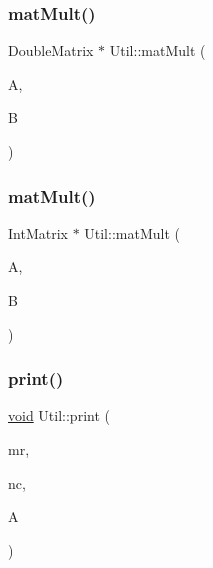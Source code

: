 \subsubsection{\texorpdfstring{mat\+Mult()}{matMult()}\hspace{0.1cm}{\footnotesize\ttfamily [5/6]}}
{\footnotesize\ttfamily Double\+Matrix $\ast$ Util\+::mat\+Mult (\begin{DoxyParamCaption}\item[{Int\+Matrix \&}]{A,  }\item[{Double\+Matrix \&}]{B }\end{DoxyParamCaption})\hspace{0.3cm}{\ttfamily [static]}}

\mbox{\label{class_l_i_b___l_a_1_1_util_af1eb9a504f1326c57da8bfff7cb9b1c5}} 
\subsubsection{\texorpdfstring{mat\+Mult()}{matMult()}\hspace{0.1cm}{\footnotesize\ttfamily [6/6]}}
{\footnotesize\ttfamily Int\+Matrix $\ast$ Util\+::mat\+Mult (\begin{DoxyParamCaption}\item[{Int\+Matrix \&}]{A,  }\item[{Int\+Matrix \&}]{B }\end{DoxyParamCaption})\hspace{0.3cm}{\ttfamily [static]}}

\mbox{\label{class_l_i_b___l_a_1_1_util_a1bd1ac655427170d4e8f241b88224fd9}} 
\subsubsection{\texorpdfstring{print()}{print()}\hspace{0.1cm}{\footnotesize\ttfamily [1/12]}}
{\footnotesize\ttfamily \hyperlink{lp__lib_8h_ac7828c7b2b31d2e11af17bdb6289c5d9}{void} Util\+::print (\begin{DoxyParamCaption}\item[{\hyperlink{lp__lib_8h_adeb9ec6400320e4923ac9d836d509ddb}{int}}]{mr,  }\item[{\hyperlink{lp__lib_8h_adeb9ec6400320e4923ac9d836d509ddb}{int}}]{nc,  }\item[{\hyperlink{lp__lib_8h_adeb9ec6400320e4923ac9d836d509ddb}{int} $\ast$}]{A }\end{DoxyParamCaption})\hspace{0.3cm}{\ttfamily [static]}}

